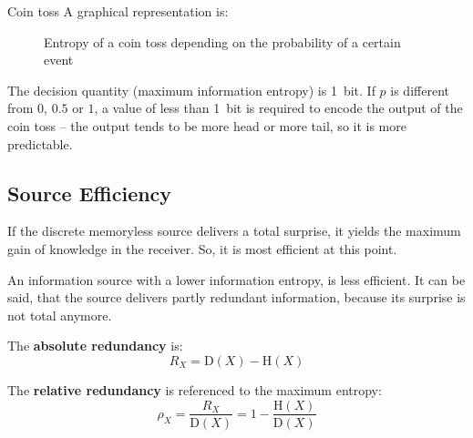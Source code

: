 \begin{refsection}
\begin{example}{Coin toss}
	A graphical representation is:
	\begin{figure}[H]
		\centering
		\caption{Entropy of a coin toss depending on the probability of a certain event}
	\end{figure}

	The decision quantity (maximum information entropy) is \SI{1}{bit}. If $p$ is different from $0$, $0.5$ or $1$, a value of less than \SI{1}{bit} is required to encode the output of the coin toss -- the output tends to be more head or more tail, so it is more predictable.
\end{example}

\subsection{Source Efficiency}

If the discrete memoryless source delivers a total surprise, it yields the maximum gain of knowledge in the receiver. So, it is most efficient at this point.

An information source with a lower information entropy, is less efficient. It can be said, that the source delivers partly redundant information, because its surprise is not total anymore.

The  \textbf{absolute redundancy} is:
\begin{equation}
	R_X = \mathrm{D}(X) - \mathrm{H}(X)
\end{equation}

The  \textbf{relative redundancy} is referenced to the maximum entropy:
\begin{equation}
	\rho_X = \frac{R_X}{\mathrm{D}(X)} = 1 - \frac{\mathrm{H}(X)}{\mathrm{D}(X)}
\end{equation}


\end{refsection}
